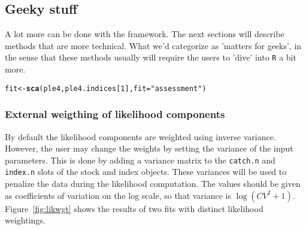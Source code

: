 \documentclass[a4paper,english,10pt]{article}\usepackage[]{graphicx}\usepackage[]{color}
\makeatletter
\newcommand{\hlnum}[1]{\textcolor[rgb]{0.686,0.059,0.569}{#1}}%
\newcommand{\hlstr}[1]{\textcolor[rgb]{0.192,0.494,0.8}{#1}}%
\newcommand{\hlstd}[1]{\textcolor[rgb]{0.345,0.345,0.345}{#1}}%
\newcommand{\hlkwb}[1]{\textcolor[rgb]{0.69,0.353,0.396}{#1}}%
\newcommand{\hlkwc}[1]{\textcolor[rgb]{0.333,0.667,0.333}{#1}}%
\newcommand{\hlkwd}[1]{\textcolor[rgb]{0.737,0.353,0.396}{\textbf{#1}}}%
\newenvironment{kframe}{%
 \def\at@end@of@kframe{}%
 \ifinner\ifhmode%
  \def\at@end@of@kframe{\end{minipage}}%
  \begin{minipage}{\columnwidth}%
 \fi\fi%
 \def\FrameCommand##1{\hskip\@totalleftmargin \hskip-\fboxsep
 \colorbox{shadecolor}{##1}\hskip-\fboxsep
     \hskip-\linewidth \hskip-\@totalleftmargin \hskip\columnwidth}%
 \MakeFramed {\advance\hsize-\width
   \@totalleftmargin\z@ \linewidth\hsize
   \@setminipage}}%
 {\par\unskip\endMakeFramed%
 \at@end@of@kframe}
\newenvironment{knitrout}{}{} %
\newcommand{\code}[1]{{\texttt{#1}}}
\newcommand{\pkg}[1]{{\texttt{#1}}}
\makeatother
\begin{document}
\subsection{Geeky stuff}

A lot more can be done with the  framework. The next sections will describe methods that are more technical. What we'd categorize as 'matters for geeks', in the sense that these methods usually will require the users to 'dive' into \pkg{R} a bit more. 

\begin{knitrout}
\color{fgcolor}\begin{kframe}
\begin{alltt}
\hlstd{fit} \hlkwb{<-} \hlkwd{sca}\hlstd{(ple4, ple4.indices[}\hlnum{1}\hlstd{],} \hlkwc{fit}\hlstd{=}\hlstr{"assessment"}\hlstd{)}
\end{alltt}


{\ttfamily\noindent\bfseries{}}\end{kframe}
\end{knitrout}

\subsubsection{External weigthing of likelihood components}

By default the likelihood components are weighted using inverse variance. However, the user may change the weights by setting the variance of the input parameters. This is done by adding a variance matrix to the \code{catch.n} and \code{index.n} slots of the stock and index objects. These variances will be used to penalize the data during the likelihood computation. The values should be given as coefficients of variation on the log scale, so that variance is $\log{({CV}^2 + 1)}$. Figure~\ref{fig:likwgt} shows the results of two fits with distinct likelihood weightings.
\end{document}

